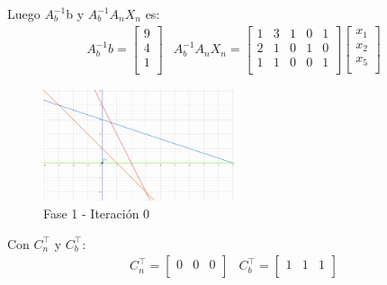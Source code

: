 \documentclass{article}
\begin{document}
\begin{flushleft}
		Luego $A_b^{-1}$b y $A_b^{-1}$$A_n$$X_n$ es:
		\begin{equation*}
			\begin{array}{cc}
				A_b^{-1}b = \begin{bmatrix}
					9 \\
					4 \\
					1 \\
				\end{bmatrix} &
				A_b^{-1}A_nX_n = \begin{bmatrix}
					1 & 3 & 1 & 0 & 1  \\
					2 & 1 & 0 & 1 & 0 \\
					1 & 1 & 0 & 0 & 1 \\
				\end{bmatrix}
				\begin{bmatrix}
					x_1 \\
					x_2 \\
					x_5 \\
				\end{bmatrix}
			\end{array}
		\end{equation*}

		\begin{figure}[ht]
			\centering
			\includegraphics[width=0.5\textwidth]{grafico2.jpg}
			\caption{Fase 1 - Iteración 0}
			\label{fig:grafico}
		\end{figure}

		Con $C_n^\intercal$ y $C_b^\intercal$:
		\begin{equation*}
			\begin{array}{cc}
				C_n^\intercal = \begin{bmatrix}
					0 & 0 & 0\\
				\end{bmatrix} &
				C_b^\intercal = \begin{bmatrix}
					1 & 1 & 1  \\
				\end{bmatrix}
			\end{array}
		\end{equation*}


\end{flushleft}
\end{document}
